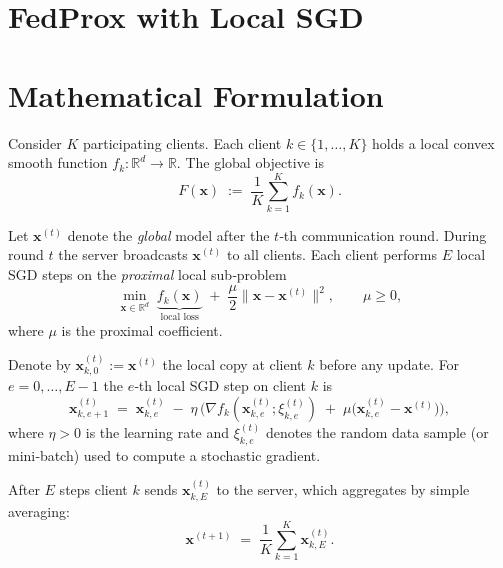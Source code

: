 \documentclass{article}
\newcommand{\R}{\mathbb{R}}
\begin{document}
\section*{FedProx with Local SGD}

\section*{Mathematical Formulation}
Consider $K$ participating clients.  
Each client $k\in\{1,\dots,K\}$ holds a local convex smooth function $f_k:\R^{d}\!\to\!\R$.  
The global objective is 
\[
F(\mathbf{x})\;:=\;\frac1K\sum_{k=1}^{K}f_k(\mathbf{x}) .
\]

Let $\mathbf{x}^{(t)}$ denote the \emph{global} model after the $t$‑th communication round.  
During round $t$ the server broadcasts $\mathbf{x}^{(t)}$ to all clients.  
Each client performs $E$ local SGD steps on the \emph{proximal} local sub‑problem
\[
\min_{\mathbf{x}\in\R^{d}}
\; \underbrace{f_k(\mathbf{x})}_{\text{local loss}}
\;+\;\frac{\mu}{2}\|\mathbf{x}-\mathbf{x}^{(t)}\|^{2},
\qquad \mu\ge 0,
\tag{1}
\]
where $\mu$ is the proximal coefficient.  

Denote by $\mathbf{x}^{(t)}_{k,0}:=\mathbf{x}^{(t)}$ the local copy at client $k$ before any update.
For $e=0,\dots,E-1$ the $e$‑th local SGD step on client $k$ is
\[
\mathbf{x}^{(t)}_{k,e+1}
\;=\;
\mathbf{x}^{(t)}_{k,e}
\;-\;
\eta\,
\bigl(
\nabla f_k(\mathbf{x}^{(t)}_{k,e};\xi^{(t)}_{k,e})
\;+\;
\mu\bigl(\mathbf{x}^{(t)}_{k,e}-\mathbf{x}^{(t)}\bigr)
\bigr),
\tag{2}
\]
where $\eta>0$ is the learning rate and $\xi^{(t)}_{k,e}$ denotes the random data sample (or mini‑batch) used to compute a stochastic gradient.  

After $E$ steps client $k$ sends $\mathbf{x}^{(t)}_{k,E}$ to the server, which aggregates by simple averaging:
\[
\mathbf{x}^{(t+1)}\;=\;\frac1K\sum_{k=1}^{K}\mathbf{x}^{(t)}_{k,E}.
\tag{3}
\]
\end{document}
